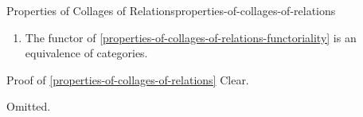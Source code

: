 \begin{proposition}{Properties of Collages of Relations}{properties-of-collages-of-relations}
\begin{enumerate}
\begin{itemize}
\[                        R%
                        \subset%
                        S%
                    \]%
                    to the morphism
                    \[
                        \eColl(\iota)%
                        \colon%
                        \eColl(R)%
                        \to%
                        \eColl(S)%
                    \]%
                    of posets over $\Delta^{1}$ defined by
                    \[
                        [\eColl(\iota)](x)%
                        \defeq%
                        x%
                    \]%
                    for each $x\in\eColl(R)$.%
                    \footnote{%
                        Note that this is indeed a morphism of posets: if $x\preceq_{\eColl(R)}y$, then $x=y$ or $x\sim_{R}y$, so we have either $x=y$ or $x\sim_{S}y$ (as $R\subset S$), and thus $x\preceq_{\eColl(S)}y$.
                        \par\vspace*{\TCBBoxCorrection}
                    }%
            \end{itemize}
        \item\label{properties-of-collages-of-relations-equivalence}The functor of \cref{properties-of-collages-of-relations-functoriality} is an equivalence of categories.
    \end{enumerate}
\end{proposition}
\begin{Proof}{Proof of \cref{properties-of-collages-of-relations}}%
    Clear.

    Omitted.
\end{Proof}
\begin{appendices}

\end{appendices}

